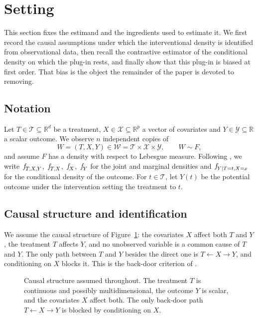 \documentclass[11pt]{article}
\theoremstyle{plain}
\theoremstyle{definition}
\theoremstyle{remark}
\newcommand{\R}{\mathbb{R}}
\newcommand{\cW}{\ensuremath{\mathcal{W}}}
\newcommand{\cX}{\ensuremath{\mathcal{X}}}
\newcommand{\cY}{\ensuremath{\mathcal{Y}}}
\newcommand{\cT}{\ensuremath{\mathcal{T}}}
\newcommand{\pf}[1]{\ensuremath{\,\mathlarger{\textit{f}}_{#1}}}
\begin{document}
\section{Setting}
\label{sec:setting}

This section fixes the estimand and the ingredients used to estimate it. We first record the
causal assumptions under which the interventional density is identified from observational
data, then recall the contrastive estimator of the conditional density on which the plug-in
rests, and finally show that this plug-in is biased at first order. That bias is the object
the remainder of the paper is devoted to removing.

\subsection{Notation}
\label{sec:setting-notation}

Let $T \in \cT \subseteq \R^{d}$ be a treatment, $X \in \cX \subseteq \R^{p}$ a vector of
covariates and $Y \in \cY \subseteq \R$ a scalar outcome. We observe $n$ independent copies
of
\[
W = (T,X,Y) \in \cW = \cT \times \cX \times \cY , \qquad W \sim F,
\]
and assume $F$ has a density with respect to Lebesgue measure. Following
\citet{meziani2025mcd}, we write $\pf{T,X,Y}$, $\pf{T,X}$, $\pf{X}$, $\pf{Y}$ for the joint
and marginal densities and $\pf{Y \mid T=t,X=x}$ for the conditional density of the outcome.
For $t \in \cT$, let $Y(t)$ be the potential outcome under the intervention setting the
treatment to $t$.

\subsection{Causal structure and identification}
\label{sec:setting-id}

We assume the causal structure of Figure~\ref{fig:dag}: the covariates $X$ affect both $T$
and $Y$, the treatment $T$ affects $Y$, and no unobserved variable is a common cause of $T$
and $Y$. The only path between $T$ and $Y$ besides the direct one is
$T \leftarrow X \rightarrow Y$, and conditioning on $X$ blocks it. This is the back-door
criterion of \citet{pearl2009}.

\begin{figure}[htbp]
    \centering
    \caption{Causal structure assumed throughout. The treatment $T$ is continuous and
    possibly multidimensional, the outcome $Y$ is scalar, and the covariates $X$ affect
    both. The only back-door path $T \leftarrow X \rightarrow Y$ is blocked by conditioning
    on $X$.}
    \label{fig:dag}
\end{figure}
\end{document}
